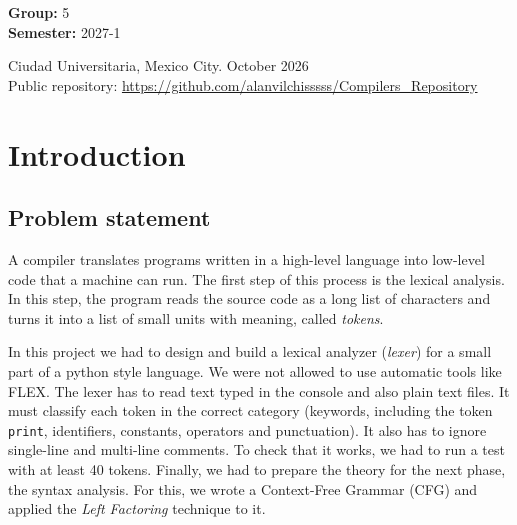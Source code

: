 \documentclass[letterpaper,12pt,oneside]{article}
\begin{document}
\begin{titlepage}
\begin{center}
\begin{center}
            \bigskip
            
            \textbf{Group:} 5 \\
            \textbf{Semester:} 2027-1
        \end{center}
        
        \vfill
        
        \begin{center}
            {Ciudad Universitaria, Mexico City. October 2026}\\
            {\footnotesize Public repository: \url{https://github.com/alanvilchisssss/Compilers_Repository}}
        \end{center}
        \cleardoublepage
    \end{center}
\end{titlepage}

\tableofcontents
\clearpage

\section{Introduction}

\subsection{Problem statement}
A compiler translates programs written in a high-level language into low-level code that a machine can run. The first step of this process is the lexical analysis. In this step, the program reads the source code as a long list of characters and turns it into a list of small units with meaning, called \textit{tokens}.

In this project we had to design and build a lexical analyzer (\textit{lexer}) for a small part of a python style language. We were not allowed to use automatic tools like FLEX. The lexer has to read text typed in the console and also plain text files. It must classify each token in the correct category (keywords, including the token \texttt{print}, identifiers, constants, operators and punctuation). It also has to ignore single-line and multi-line comments. To check that it works, we had to run a test with at least 40 tokens. Finally, we had to prepare the theory for the next phase, the syntax analysis. For this, we wrote a Context-Free Grammar (CFG) and applied the \textit{Left Factoring} technique to it.
\end{document}
